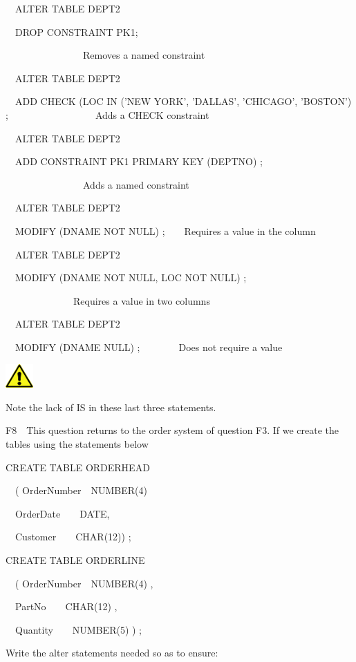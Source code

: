 \ \ ALTER TABLE DEPT2

\ \ DROP CONSTRAINT PK1;

\ \ \ \ \ \ \ \ \ \ \ \ \ \ \ \ Removes a named constraint

\ \ ALTER TABLE DEPT2

\ \ ADD CHECK (LOC IN ('NEW YORK', 'DALLAS', 'CHICAGO', 'BOSTON') ;\ \ \ \ \ \ \ \ \ \ \ \ \ \ \ \ \ \ Adds a CHECK constraint

\ \ ALTER TABLE DEPT2 

\ \ ADD CONSTRAINT PK1 PRIMARY KEY (DEPTNO) ;

\ \ \ \ \ \ \ \ \ \ \ \ \ \ \ \ Adds a named constraint

\ \ ALTER TABLE DEPT2

\ \ MODIFY (DNAME NOT NULL) ;\ \ \ \ Requires a value in the column

\ \ ALTER TABLE DEPT2

\ \ MODIFY (DNAME NOT NULL, LOC NOT NULL) ;\ \ \ \ 

\ \ \ \ \ \ \ \ \ \ \ \ \ \ Requires a value in two columns

\ \ ALTER TABLE DEPT2

\ \ MODIFY (DNAME NULL) ;\ \ \ \ \ \ \ \ Does not require a value



\begin{center}
  
\includegraphics[width=1.076cm,height=0.917cm]{images/img (2).png}

\end{center}
Note the lack of IS in these last three statements.

F8\ \ This question returns to the order system of question F3. If we create the tables using the statements below

CREATE TABLE ORDERHEAD

\ \ ( OrderNumber\ \ NUMBER(4)

\ \   OrderDate\ \ \ \ DATE,

\ \   Customer\ \ \ \ CHAR(12)) ;

 CREATE TABLE ORDERLINE

\ \ ( OrderNumber\ \ NUMBER(4) ,

\ \   PartNo\ \ \ \ CHAR(12) ,

\ \   Quantity\ \ \ \ NUMBER(5) ) ;

Write the alter statements needed so as to ensure:

